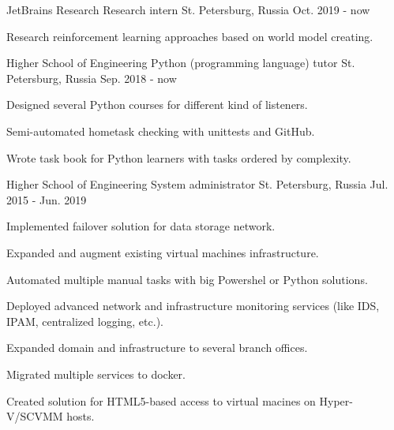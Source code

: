 

\begin{cventries}
	
  \cventry
	{JetBrains Research} %
	{Research intern} %
	{St. Petersburg, Russia} %
	{Oct. 2019 - now} %
	{
		\begin{cvitems} %
			\item {Research reinforcement learning approaches based on world model creating.}
		\end{cvitems}
}

  \cventry
    {Higher School of Engineering} %
    {Python (programming language) tutor} %
    {St. Petersburg, Russia} %
    {Sep. 2018 - now} %
    {
		\begin{cvitems} %
		 \item {Designed several Python courses for different kind of listeners.}
		 \item {Semi-automated hometask checking with unittests and GitHub.}
		 \item {Wrote task book for Python learners with tasks ordered by complexity.}
		\end{cvitems}
    }

  \cventry
	{Higher School of Engineering} %
	{System administrator} %
	{St. Petersburg, Russia} %
	{Jul. 2015 - Jun. 2019} %
	{
		\begin{cvitems} %
			\item {Implemented failover solution for data storage network.}
			\item {Expanded and augment existing virtual machines infrastructure.}
			\item {Automated multiple manual tasks with big Powershel or Python solutions.}
			\item {Deployed advanced network and infrastructure monitoring services (like IDS, IPAM, centralized logging, etc.).}
			\item {Expanded domain and infrastructure to several branch offices.}
			\item {Migrated multiple services to docker.}
			\item {Created solution for HTML5-based access to virtual macines on Hyper-V/SCVMM hosts.}
		\end{cvitems}
}

\end{cventries}
